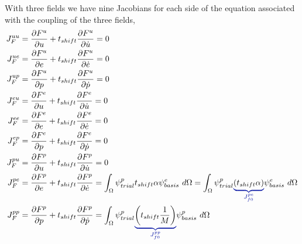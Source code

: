 With three fields we have nine Jacobians for each side of the equation associated with the coupling of the three fields, 
\begin{align}
J_F^{uu} &= \frac{\partial F^u}{\partial u} + t_{shift} \frac{\partial F^u}{\partial \dot{u}} = 0 \\
%
J_F^{ue} &= \frac{\partial F^u}{\partial e} + t_{shift} \frac{\partial F^u}{\partial \dot{e}} = 0 \\
%
J_F^{up} &= \frac{\partial F^u}{\partial p} + t_{shift} \frac{\partial F^u}{\partial \dot{p}} = 0 \\
%
J_F^{eu} &= \frac{\partial F^e}{\partial u} + t_{shift} \frac{\partial F^e}{\partial \dot{u}} = 0 \\
%
J_F^{ee} &= \frac{\partial F^e}{\partial e} + t_{shift} \frac{\partial F^e}{\partial \dot{e}} = 0 \\
%
J_F^{ep} &= \frac{\partial F^e}{\partial p} + t_{shift} \frac{\partial F^e}{\partial \dot{p}} = 0 \\
%
J_F^{pu} &= \frac{\partial F^p}{\partial u} + t_{shift} \frac{\partial F^p}{\partial \dot{u}} = 0 \\
%
J_F^{pe} &= \frac{\partial F^p}{\partial e} + t_{shift} \frac{\partial 
F^p}{\partial \dot{e}} = \int_{\Omega} \psi_{trial}^p t_{shift} \alpha 
\psi_{basis}^e \ d\Omega = \int_{\Omega} \psi_{trial}^p 
\eqnannotate{\left(t_{shift} \alpha \right)}{J_{f0}^{pe}} \psi_{basis}^e \ 
d\Omega \\
%
J_F^{pp} &= \frac{\partial F^p}{\partial p} + t_{shift} \frac{\partial 
F^p}{\partial \dot{p}} = \int_{\Omega} \psi_{trial}^p 
\eqnannotate{\left(t_{shift} \frac{1}{M}\right)}{J_{f0}^{pp}} \psi_{basis}^p \ 
d\Omega
\end{align}

